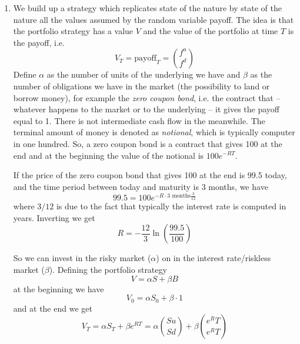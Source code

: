 \begin{enumerate}
    \item We build up a strategy which replicates state of the nature by state of the nature all the values assumed by the random variable payoff. The idea is that the portfolio strategy has a value $V$ and the value of the portfolio at time $T$ is the payoff, i.e.
    \begin{equation*}
        V_T = \mbox{payoff}_T = \binom{f^u}{f^d}
    \end{equation*}
    Define $\alpha$ as the number of units of the underlying we have and $\beta$ as the number of obligations we have in the market (the possibility to land or borrow money), for example the \emph{zero coupon bond}, i.e. the contract that -- whatever happens to the market or to the underlying -- it gives the payoff equal to 1. There is not intermediate cash flow in the meanwhile. The terminal amount of money is denoted as \emph{notional}, which is typically computer in one hundred. So, a zero coupon bond is a contract that gives 100 at the end and at the beginning the value of the notional is $100e^{-RT}$. 
    \begin{example}{}{} 
    If the price of the zero coupon bond that gives 100 at the end is 99.5 today, and the time period between today and maturity is 3 months, we have
    \begin{equation*}
        99.5 = 100e^{-R\cdot3\mbox{ months}\frac{3}{12}}
    \end{equation*}
    where $3/12$ is due to the fact that typically the interest rate is computed in years. Inverting we get
    \begin{equation*}
        R = -\dfrac{12}{3}\ln\left(\dfrac{99.5}{100}\right)
    \end{equation*}
    \end{example}
    So we can invest in the risky market ($\alpha$) on in the interest rate/riskless market ($\beta$). Defining the portfolio strategy 
    \begin{equation*}
        V = \alpha S + \beta B
    \end{equation*}
    at the beginning we have 
    \begin{equation*}
        V_0 = \alpha S_0 + \beta\cdot1
    \end{equation*}
    and at the end we get 
    \begin{equation}
        V_T = \alpha S_T + \beta e^{RT} = \alpha\binom{Su}{Sd} + \beta\binom{e^RT}{e^RT}
    \end{equation}

\end{enumerate}
